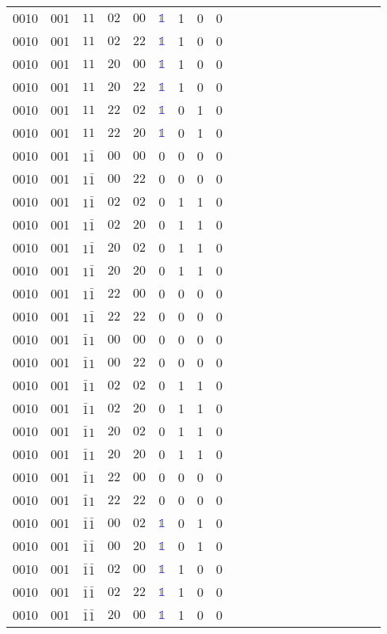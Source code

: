\begin{longtable*}{c| cccccccccccccccccccc }
0010& 001& $11$& $02$& $00$& \textcolor{blue}{$\mathds{1}$}& 1& 0& 0\\
0010& 001& $11$& $02$& $22$& \textcolor{blue}{$\mathds{1}$}& 1& 0& 0\\
0010& 001& $11$& $20$& $00$& \textcolor{blue}{$\mathds{1}$}& 1& 0& 0\\
0010& 001& $11$& $20$& $22$& \textcolor{blue}{$\mathds{1}$}& 1& 0& 0\\
0010& 001& $11$& $22$& $02$& \textcolor{blue}{$\mathds{1}$}& 0& 1& 0\\
0010& 001& $11$& $22$& $20$& \textcolor{blue}{$\mathds{1}$}& 0& 1& 0\\
0010& 001& $1\bar{1}$& $00$& $00$& 0& 0& 0& 0\\
0010& 001& $1\bar{1}$& $00$& $22$& 0& 0& 0& 0\\
0010& 001& $1\bar{1}$& $02$& $02$& 0& 1& 1& 0\\
0010& 001& $1\bar{1}$& $02$& $20$& 0& 1& 1& 0\\
0010& 001& $1\bar{1}$& $20$& $02$& 0& 1& 1& 0\\
0010& 001& $1\bar{1}$& $20$& $20$& 0& 1& 1& 0\\
0010& 001& $1\bar{1}$& $22$& $00$& 0& 0& 0& 0\\
0010& 001& $1\bar{1}$& $22$& $22$& 0& 0& 0& 0\\
0010& 001& $\bar{1}1$& $00$& $00$& 0& 0& 0& 0\\
0010& 001& $\bar{1}1$& $00$& $22$& 0& 0& 0& 0\\
0010& 001& $\bar{1}1$& $02$& $02$& 0& 1& 1& 0\\
0010& 001& $\bar{1}1$& $02$& $20$& 0& 1& 1& 0\\
0010& 001& $\bar{1}1$& $20$& $02$& 0& 1& 1& 0\\
0010& 001& $\bar{1}1$& $20$& $20$& 0& 1& 1& 0\\
0010& 001& $\bar{1}1$& $22$& $00$& 0& 0& 0& 0\\
0010& 001& $\bar{1}1$& $22$& $22$& 0& 0& 0& 0\\
0010& 001& $\bar{1}\bar{1}$& $00$& $02$& \textcolor{blue}{$\mathds{1}$}& 0& 1& 0\\
0010& 001& $\bar{1}\bar{1}$& $00$& $20$& \textcolor{blue}{$\mathds{1}$}& 0& 1& 0\\
0010& 001& $\bar{1}\bar{1}$& $02$& $00$& \textcolor{blue}{$\mathds{1}$}& 1& 0& 0\\
0010& 001& $\bar{1}\bar{1}$& $02$& $22$& \textcolor{blue}{$\mathds{1}$}& 1& 0& 0\\
0010& 001& $\bar{1}\bar{1}$& $20$& $00$& \textcolor{blue}{$\mathds{1}$}& 1& 0& 0\\

\end{longtable*}
